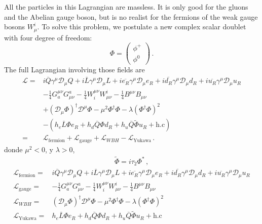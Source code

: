\begin{frame}
All the particles in this Lagrangian are massless. It is only good for the gluons and the Abelian gauge boson, but is no realist for the fermions of the weak gauge bosons $W_\mu^i$. To solve this problem, we postulate a new complex scalar doublet with four degree of freedom:
\begin{equation}
  \Phi=
  \begin{pmatrix}
    \phi^+\\
    \phi^0
  \end{pmatrix}\,.
\end{equation} 
The full Lagrangian involving those fields are 
\begin{align}
     \mathcal{L}=&i\overline{Q}\gamma^\mu\mathcal{D}_\mu Q+i\overline{L}\gamma^\mu\mathcal{D}_\mu L+
i\overline{e_R}\gamma^\mu\mathcal{D}_\mu {e_R}+i\overline{d_R}\gamma^\mu\mathcal{D}_\mu {d_R}+i\overline{u_R}\gamma^\mu\mathcal{D}_\mu {u_R}
\nonumber\\
     &-\tfrac{1}{4}G^{\mu\nu}_a G_{\mu\nu}^a-\tfrac{1}{4}W^{\mu\nu}_i W_{\mu\nu}^i-\tfrac{1}{4}B^{\mu\nu} B_{\mu\nu}\nonumber\\
     &+(\mathcal{D}_\mu\Phi)^\dagger\mathcal{D}^\mu\Phi-\mu^2\Phi^\dagger\Phi-\lambda(\Phi^\dagger\Phi)^2\nonumber\\
     &-(h_e\overline{L}\Phi e_R+h_d\overline{Q}\Phi d_R+h_u\overline{Q}\widetilde{\Phi}u_R+\text{h.c})\nonumber\\
     =&\mathcal{L}_{\text{fermion}}+\mathcal{L}_{\text{gauge}}
     +\mathcal{L}_{WBH}
     -\mathcal{L}_{\text{Yukawa}}\,.
\end{align}
donde $\mu^2<0$, y $\lambda>0$,
\begin{align}
  \widetilde{\Phi}=i\tau_2\Phi^*\,,
\end{align}
\begin{align}
  \label{eq:smscalar}
\mathcal{L}_{\text{fermion}}=&i\overline{Q}\gamma^\mu\mathcal{D}_\mu Q+i\overline{L}\gamma^\mu\mathcal{D}_\mu L+
i\overline{e_R}\gamma^\mu\mathcal{D}_\mu {e_R}+i\overline{d_R}\gamma^\mu\mathcal{D}_\mu {d_R}+i\overline{u_R}\gamma^\mu\mathcal{D}_\mu {u_R}\nonumber\\
\mathcal{L}_{\text{gauge}}=& -\tfrac{1}{4}G^{\mu\nu}_a G_{\mu\nu}^a-\tfrac{1}{4}W^{\mu\nu}_i W_{\mu\nu}^i-\tfrac{1}{4}B^{\mu\nu} B_{\mu\nu}\nonumber\\
  \mathcal{L}_{WBH}=&(\mathcal{D}_\mu\Phi)^\dagger\mathcal{D}^\mu\Phi-\mu^2\Phi^\dagger\Phi-\lambda(\Phi^\dagger\Phi)^2\nonumber\\
\mathcal{L}_{\text{Yukawa}}=&h_e\overline{L}\Phi e_R+h_d\overline{Q}\Phi d_R+h_u\overline{Q}\widetilde{\Phi}u_R+\text{h.c}
\end{align}



\end{frame}
